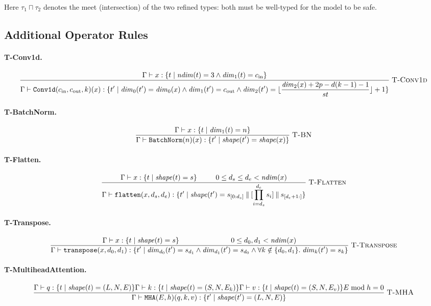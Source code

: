 \documentclass[10pt]{article}
\newcommand{\typerule}[3]{%
  \frac{\displaystyle #2}{\displaystyle #3}
  \;\textsc{#1}%
}
\theoremstyle{plain}
\theoremstyle{definition}
\theoremstyle{remark}
\begin{document}
\noindent
Here $\tau_1 \sqcap \tau_2$ denotes the meet (intersection) of the
two refined types: both must be well-typed for the model to be
safe.

\subsection{Additional Operator Rules}

\paragraph{T-Conv1d.}
\[
\typerule{T-Conv1d}{\Gamma \vdash x : \{t \mid \mathit{ndim}(t) = 3 \land
    \mathit{dim}_1(t) = c_\text{in}\}}{\Gamma \vdash \texttt{Conv1d}(c_\text{in}, c_\text{out}, k)(x) :
    \{t' \mid \mathit{dim}_0(t') = \mathit{dim}_0(x) \land
    \mathit{dim}_1(t') = c_\text{out} \land
    \mathit{dim}_2(t') = \lfloor\frac{\mathit{dim}_2(x) + 2p -
      d(k-1)-1}{st}\rfloor + 1\}}
\]

\paragraph{T-BatchNorm.}
\[
\typerule{T-BN}{\Gamma \vdash x : \{t \mid \mathit{dim}_1(t) = n\}}{\Gamma \vdash \texttt{BatchNorm}(n)(x) :
    \{t' \mid \mathit{shape}(t') = \mathit{shape}(x)\}}
\]

\paragraph{T-Flatten.}
\[
\typerule{T-Flatten}{\Gamma \vdash x : \{t \mid \mathit{shape}(t) = s\} \\
   0 \leq d_s \leq d_e < \mathit{ndim}(x)}{\Gamma \vdash \texttt{flatten}(x, d_s, d_e) :
    \{t' \mid \mathit{shape}(t') = s_{[0:d_s]} \mathbin\|
    [\prod_{i=d_s}^{d_e} s_i] \mathbin\| s_{[d_e+1:]}\}}
\]

\paragraph{T-Transpose.}
\[
\typerule{T-Transpose}{\Gamma \vdash x : \{t \mid \mathit{shape}(t) = s\} \\
   0 \leq d_0, d_1 < \mathit{ndim}(x)}{\Gamma \vdash \texttt{transpose}(x, d_0, d_1) :
    \{t' \mid \mathit{dim}_{d_0}(t') = s_{d_1} \land
    \mathit{dim}_{d_1}(t') = s_{d_0} \land
    \forall k \notin \{d_0,d_1\}.\; \mathit{dim}_k(t') = s_k\}}
\]

\paragraph{T-MultiheadAttention.}
\[
\typerule{T-MHA}{\Gamma \vdash q : \{t \mid \mathit{shape}(t) = (L, N, E)\} \\
   \Gamma \vdash k : \{t \mid \mathit{shape}(t) = (S, N, E_k)\} \\
   \Gamma \vdash v : \{t \mid \mathit{shape}(t) = (S, N, E_v)\} \\
   E \bmod h = 0}{\Gamma \vdash \texttt{MHA}(E, h)(q, k, v) :
    \{t' \mid \mathit{shape}(t') = (L, N, E)\}}
\]
\end{document}
